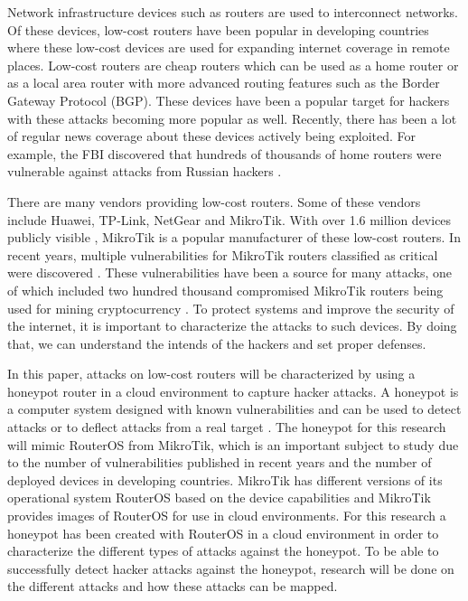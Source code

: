 Network infrastructure devices such as routers are used to interconnect networks. Of these devices, low-cost routers have been popular in developing countries where these low-cost devices are used for expanding internet coverage in remote places. Low-cost routers are cheap routers which can be used as a home router or as a local area router with more advanced routing features such as the Border Gateway Protocol (BGP). These devices have been a popular target for hackers with these attacks becoming more popular as well. Recently, there has been a lot of regular news coverage about these devices actively being exploited. For example, the FBI discovered that hundreds of thousands of home routers were vulnerable against attacks from Russian hackers \cite{FBIRus:REUTERS:2018}.

There are many vendors providing low-cost routers. Some of these vendors include Huawei, TP-Link, NetGear and MikroTik. With over 1.6 million devices publicly visible \cite{MIKROTIK:SHODAN:2019}, MikroTik is a popular manufacturer of these low-cost routers. In recent years, multiple vulnerabilities for MikroTik routers classified as critical were discovered \cite{CVELIST}. These vulnerabilities have been a source for many attacks, one of which included two hundred thousand compromised MikroTik routers being used for mining cryptocurrency \cite{MikroTikCryptoHack:PCMAG:2018}. To protect systems and improve the security of the internet, it is important to characterize the attacks to such devices. By doing that, we can understand the intends of the hackers and set proper defenses. 

In this paper, attacks on low-cost routers will be characterized by using a honeypot router in a cloud environment to capture hacker attacks. A honeypot is a computer system designed with known vulnerabilities and can be used to detect attacks or to deflect attacks from a real target \cite{HONEYPOTDEF:NORTON}. The honeypot for this research will mimic RouterOS from MikroTik, which is an important subject to study due to the number of vulnerabilities published in recent years and the number of deployed devices in developing countries. MikroTik has different versions of its operational system RouterOS based on the device capabilities and MikroTik provides images of RouterOS for use in cloud environments. For this research a honeypot has been created with RouterOS in a cloud environment in order to characterize the different types of attacks against the honeypot. To be able to successfully detect hacker attacks against the honeypot, research will be done on the different attacks and how these attacks can be mapped.

